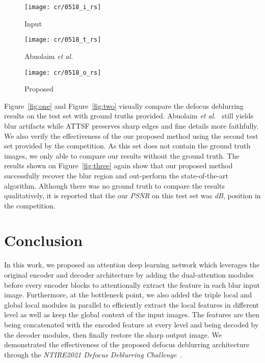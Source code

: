 \documentclass[final]{cvpr}
\begin{document}
\begin{figure*}
        \begin{subfigure}[b]{0.32\textwidth}
                \texttt{[image: cr/0518\_i\_rs]}
                \caption{Input}
        \end{subfigure}\hspace{\fill}
        \begin{subfigure}[b]{0.32\textwidth}
                \texttt{[image: cr/0518\_t\_rs]}
                \caption{Abuolaim \textit{et al.}~\cite{abuolaim2020defocus} }
        \end{subfigure}\hspace{\fill}
        \begin{subfigure}[b]{0.32\textwidth}
                \texttt{[image: cr/0518\_o\_rs]}
                 \caption{Proposed}
        \label{fig:visual}
        \end{subfigure}\hspace{\fill}
       
        \caption{Visual comparison of the proposed algorithm and Abuolaim \textit{et al.}~\cite{abuolaim2020defocus}'s algorithm. Abuolaim \textit{et al.}~\cite{abuolaim2020defocus} fails to produce the non-blur output while the proposed algorithm faithfully remove the blur artifact and generate sharp images.}\label{fig:three}
\end{figure*}


Figure~\ref{fig:one} and Figure~\ref{fig:two} visually compare the defocus deblurring results on the test set with ground truths provided. Abuolaim \textit{et al.}~\cite{abuolaim2020defocus} still yields blur artifacts while ATTSF preserves sharp edges and fine details more faithfully. We also verify the effectiveness of the our proposed method using the second test set provided by the competition. As this set does not contain the ground truth images, we only able to compare our results without the ground truth. The results shown on Figure~\ref{fig:three} again show that our proposed method successfully recover the blur region and out-perform the state-of-the-art algorithm. Although there was no ground truth to compare the results qualitatively, it is reported that the our \textit{PSNR} on this test set was  \textit{dB},  position in the competition.

\section{Conclusion}
In this work, we proposed an attention deep learning network which leverages the original encoder and decoder architecture by adding the dual-attention modules before every encoder blocks to attentionally extract the feature in each blur input image. Furthermore, at the bottleneck point, we also added the triple local and global local modules in parallel to efficiently extract the local features in different level as well as keep the global context of the input images. The features are then being concatenated with the encoded feature at every level and being decoded by the decoder modules, then finally restore the sharp output image. We demonstrated the effectiveness of the proposed defocus deblurring architecture through the \textit{NTIRE2021 Defocus Deblurring Challenge~\cite{ntire}}.



\end{document}
